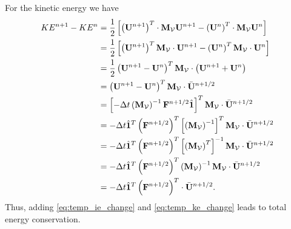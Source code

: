 \documentclass[11pt]{report}
\begin{document}
For the kinetic energy we have
\begin{align}
    \label{eq:temp_ke_change}
    KE^{n+1} - KE^n &= \frac{1}{2} \left[ \left( \mathbf{U}^{n+1} \right)^T \cdot \mathbf{M}_\mathcal{V} \mathbf{U}^{n+1} - \left( \mathbf{U}^n \right)^T \cdot \mathbf{M}_\mathcal{V} \mathbf{U}^n \right] \nonumber \\
    &= \frac{1}{2} \left[ \left( \mathbf{U}^{n+1} \right)^T \mathbf{M}_\mathcal{V} \cdot \mathbf{U}^{n+1} - \left( \mathbf{U}^n \right)^T \mathbf{M}_\mathcal{V} \cdot \mathbf{U}^n \right] \nonumber \\
    &= \frac{1}{2} \left( \mathbf{U}^{n+1} - \mathbf{U}^n \right)^T \mathbf{M}_\mathcal{V} \cdot \left( \mathbf{U}^{n+1} + \mathbf{U}^n \right) \nonumber \\ 
    &= \left( \mathbf{U}^{n+1} - \mathbf{U}^n \right)^T \mathbf{M}_\mathcal{V} \cdot \bar{\mathbf{U}}^{n+1/2} \nonumber \\
    &= \left[ - \Delta t \left( \mathbf{M}_\mathcal{V} \right)^{-1} \mathbf{F}^{n+1/2} \hat{\mathbf{1}} \right]^T \mathbf{M}_\mathcal{V} \cdot \bar{\mathbf{U}}^{n+1/2} \nonumber \\
    &= -\Delta t \hat{\mathbf{1}}^T \left( \mathbf{F}^{n+1/2} \right)^T \left[ \left( \mathbf{M}_\mathcal{V} \right)^{-1} \right]^T \mathbf{M}_\mathcal{V} \cdot \bar{\mathbf{U}}^{n+1/2} \nonumber \\
    &= -\Delta t \hat{\mathbf{1}}^T \left( \mathbf{F}^{n+1/2} \right)^T \left[ \left( \mathbf{M}_\mathcal{V} \right)^T \right]^{-1} \mathbf{M}_\mathcal{V} \cdot \bar{\mathbf{U}}^{n+1/2} \nonumber \\
    &= -\Delta t \hat{\mathbf{1}}^T \left( \mathbf{F}^{n+1/2} \right)^T \left( \mathbf{M}_\mathcal{V} \right)^{-1} \mathbf{M}_\mathcal{V} \cdot \bar{\mathbf{U}}^{n+1/2} \nonumber \\
    &= -\Delta t \hat{\mathbf{1}}^T \left( \mathbf{F}^{n+1/2} \right)^T \cdot \bar{\mathbf{U}}^{n+1/2}.
\end{align}
Thus, adding \cref{eq:temp_ie_change} and \cref{eq:temp_ke_change} leads to total energy conservation.

\end{document}
